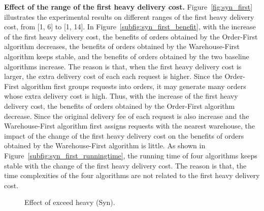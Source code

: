 \textbf{Effect of the range of the first heavy delivery cost.}  Figure~\ref{fig:syn_first} illustrates the experimental results on different ranges of the first heavy delivery cost, from [1, 6] to [1, 14]. In Figure~\ref{subfig:syn_first_benefit}, with the increase of the first heavy delivery cost, the benefits of orders obtained by the Order-First algorithm decreases, the benefits of orders obtained by the Warehouse-First algorithm keeps stable, and the benefits of orders obtained by the two baseline algorithms increase. The reason is that, when the first heavy delivery cost is larger, the extra delivery cost of each each request is higher. Since the Order-First algorithm first groups requests into orders, it may generate many orders whose extra delivery cost is high. Thus, with the increase of the first heavy delivery cost, the benefits of orders obtained by the Order-First algorithm decrease. Since the original delivery fee of each request is also increase and the Warehouse-First algorithm first assigns requests with the nearest warehouse, the impact of the change of the first heavy delivery cost on the benefits of orders obtained by the Warehouse-First algorithm is little. As shown in Figure~\ref{subfig:syn_first_runningtime}, the running time of four algorithms keeps stable with the change of the first heavy delivery cost. The reason is that, the time complexities of the four algorithms are not related to the first heavy delivery cost.

\begin{figure}[t!]\centering
	\subfigcapskip=-5pt
		\vspace{1ex}
	\vspace{-2ex}
	\addtocounter{subfigure}{-1}
	\figureCaptionMargin
	\vspace{1ex}
	\caption{\small Effect of exceed heavy (Syn).}\figureBelowMargin
	\label{fig:syn_exceed}
\end{figure}

